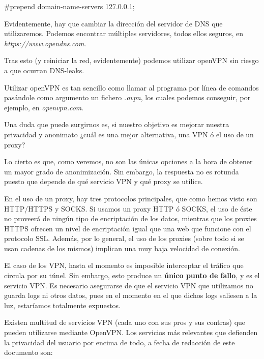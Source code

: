 	{\selectfont 
		\#prepend domain-name-servers 127.0.0.1;
	}

	Evidentemente, hay que cambiar la dirección del servidor de DNS que utilizaremos. Podemos encontrar múltiples servidores, todos ellos seguros, en \textit{https://www.opendns.com}.
	
	Tras esto (y reiniciar la red, evidentemente) podemos utilizar openVPN sin riesgo a que ocurran DNS-leaks.
	
	Utilizar openVPN es tan sencillo como llamar al programa por línea de comandos pasándole como argumento un fichero \textit{.ovpn}, los cuales podemos conseguir, por ejemplo, en \textit{openvpn.com}.
	
	Una duda que puede surgirnos es, si nuestro objetivo es mejorar nuestra privacidad y anonimato ¿cuál es una mejor alternativa, una VPN ó el uso de un proxy? 
	
	Lo cierto es que, como veremos, no son las únicas opciones a la hora de obtener un mayor grado de anonimización. Sin embargo, la respuesta no es rotunda puesto que depende de qué servicio VPN y qué proxy se utilice.
	
	En el uso de un proxy, hay tres protocolos principales, que como hemos visto son HTTP/HTTPS y SOCKS.
	Si usamos un proxy HTTP ó SOCKS, el uso de éste no proveerá de ningún tipo de encriptación de los datos, mientras que los proxies HTTPS ofrecen un nivel de encriptación igual que una web que funcione con el protocolo SSL. Además, por lo general, el uso de los proxies (sobre todo si se usan cadenas de los mismos) implican una muy baja velocidad de conexión.
	
	El caso de los VPN, hasta el momento es imposible interceptar el tráfico que circula por su túnel. Sin embargo, esto produce un \textbf{único punto de fallo}, y es el servicio VPN. Es necesario asegurarse de que el servicio VPN que utilizamos no guarda logs ni otros datos, pues en el momento en el que dichos logs saliesen a la luz, estaríamos totalmente expuestos.
	
	Existen multitud de servicios VPN (cada uno con sus pros y sus contras) que pueden utilizarse mediante OpenVPN. Los servicios más relevantes que defienden la privacidad del usuario por encima de todo, a fecha de redacción de este documento son:
	
